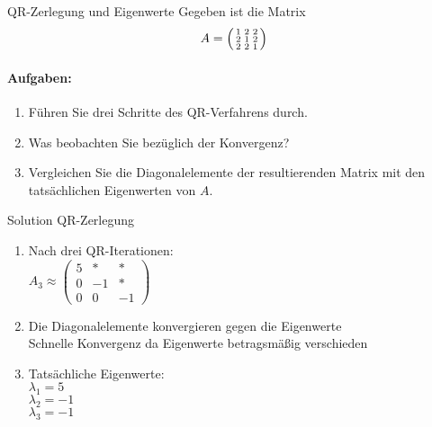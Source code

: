 \begin{example2}{QR-Zerlegung und Eigenwerte}
Gegeben ist die Matrix
$$A = \begin{psmallmatrix}
1 & 2 & 2\\
2 & 1 & 2\\
2 & 2 & 1
\end{psmallmatrix}$$

\paragraph{Aufgaben:}
\begin{enumerate}
    \item Führen Sie drei Schritte des QR-Verfahrens durch.
    
    \item Was beobachten Sie bezüglich der Konvergenz? 
    
    \item Vergleichen Sie die Diagonalelemente der resultierenden Matrix mit den tatsächlichen Eigenwerten von $A$.
\end{enumerate}
\end{example2}

\begin{KR}{Solution QR-Zerlegung}
\begin{enumerate}
    \item Nach drei QR-Iterationen:\\
    $A_3 \approx \begin{pmatrix}
    5 & * & *\\
    0 & -1 & *\\
    0 & 0 & -1
    \end{pmatrix}$
    
    \item Die Diagonalelemente konvergieren gegen die Eigenwerte\\
    Schnelle Konvergenz da Eigenwerte betragsmäßig verschieden
    
    \item Tatsächliche Eigenwerte:\\
    $\lambda_1 = 5$\\
    $\lambda_2 = -1$\\
    $\lambda_3 = -1$
\end{enumerate}
\end{KR}

